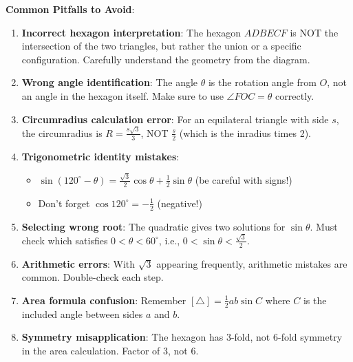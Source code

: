 \documentclass[12pt]{article}
\begin{document}
\begin{warningbox}
\textbf{Common Pitfalls to Avoid}:

\begin{enumerate}
    \item \textbf{Incorrect hexagon interpretation}: The hexagon $ADBECF$ is NOT the intersection of the two triangles, but rather the union or a specific configuration. Carefully understand the geometry from the diagram.
    
    \item \textbf{Wrong angle identification}: The angle $\theta$ is the rotation angle from $O$, not an angle in the hexagon itself. Make sure to use $\angle FOC = \theta$ correctly.
    
    \item \textbf{Circumradius calculation error}: For an equilateral triangle with side $s$, the circumradius is $R = \frac{s\sqrt{3}}{3}$, NOT $\frac{s}{2}$ (which is the inradius times 2).
    
    \item \textbf{Trigonometric identity mistakes}: 
    \begin{itemize}
        \item $\sin(120^{\circ} - \theta) = \frac{\sqrt{3}}{2}\cos\theta + \frac{1}{2}\sin\theta$ (be careful with signs!)
        \item Don't forget $\cos 120^{\circ} = -\frac{1}{2}$ (negative!)
    \end{itemize}
    
    \item \textbf{Selecting wrong root}: The quadratic gives two solutions for $\sin\theta$. Must check which satisfies $0 < \theta < 60^{\circ}$, i.e., $0 < \sin\theta < \frac{\sqrt{3}}{2}$.
    
    \item \textbf{Arithmetic errors}: With $\sqrt{3}$ appearing frequently, arithmetic mistakes are common. Double-check each step.
    
    \item \textbf{Area formula confusion}: Remember $[\triangle] = \frac{1}{2}ab\sin C$ where $C$ is the included angle between sides $a$ and $b$.
    
    \item \textbf{Symmetry misapplication}: The hexagon has 3-fold, not 6-fold symmetry in the area calculation. Factor of 3, not 6.
\end{enumerate}
\end{warningbox}
\end{document}
